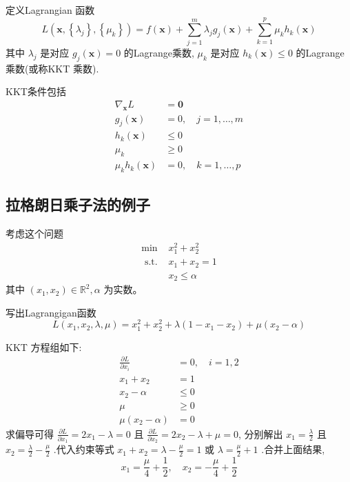 \begin{theorem}[标准约束优化的KKT条件]
    定义Lagrangian 函数
$$
L\left(\mathbf{x},\left\{\lambda_{j}\right\},\left\{\mu_{k}\right\}\right)=f(\mathbf{x})+\sum_{j=1}^{m} \lambda_{j} g_{j}(\mathbf{x})+\sum_{k=1}^{p} \mu_{k} h_{k}(\mathbf{x})
$$
其中 $ \lambda_{j} $ 是对应 $ g_{j}(\mathbf{x})=0 $ 的Lagrange乘数, $ \mu_{k} $ 是对应 $ h_{k}(\mathbf{x}) \leq 0 $ 的Lagrange乘数(或称KKT 乘数). 

KKT条件包括
$$
\begin{aligned}
\nabla_{\mathbf{x}} L &=\mathbf{0} \\
g_{j}(\mathbf{x}) &=0, \quad j=1, \ldots, m \\
h_{k}(\mathbf{x}) & \leq 0 \\
\mu_{k} & \geq 0 \\
\mu_{k} h_{k}(\mathbf{x}) &=0, \quad k=1, \ldots, p
\end{aligned}
$$

\end{theorem}

\subsection{拉格朗日乘子法的例子}

\begin{problem}

    考虑这个问题
$$
\begin{array}{ll}
\min & x_{1}^{2}+x_{2}^{2} \\
\text { s.t. } & x_{1}+x_{2}=1 \\
& x_{2} \leq \alpha
\end{array}
$$
其中 $ \left(x_{1}, x_{2}\right) \in \mathbb{R}^{2}, \alpha $ 为实数。
\end{problem}

写出Lagrangigan函数
$$
L\left(x_{1}, x_{2}, \lambda, \mu\right)=x_{1}^{2}+x_{2}^{2}+\lambda\left(1-x_{1}-x_{2}\right)+\mu\left(x_{2}-\alpha\right)
$$

KKT 方程组如下:
$$
\begin{aligned}
\frac{\partial L}{\partial x_{i}} &=0, \quad i=1,2 \\
x_{1}+x_{2} &=1 \\
x_{2}-\alpha & \leq 0 \\
\mu & \geq 0 \\
\mu\left(x_{2}-\alpha\right) &=0
\end{aligned}
$$
求偏导可得 $ \frac{\partial L}{\partial x_{1}}=2 x_{1}-\lambda=0 $ 且 $ \frac{\partial L}{\partial x_{2}}=2 x_{2}-\lambda+\mu=0 $, 分别解出 $ x_{1}=\frac{\lambda}{2} $ 且 $ x_{2}=\frac{\lambda}{2}-\frac{\mu}{2} $ .代入约束等式 $ x_{1}+x_{2}=\lambda-\frac{\mu}{2}=1 $ 或 $ \lambda=\frac{\mu}{2}+1 $ .合并上面结果,
$$
x_{1}=\frac{\mu}{4}+\frac{1}{2}, \quad x_{2}=-\frac{\mu}{4}+\frac{1}{2}
$$

